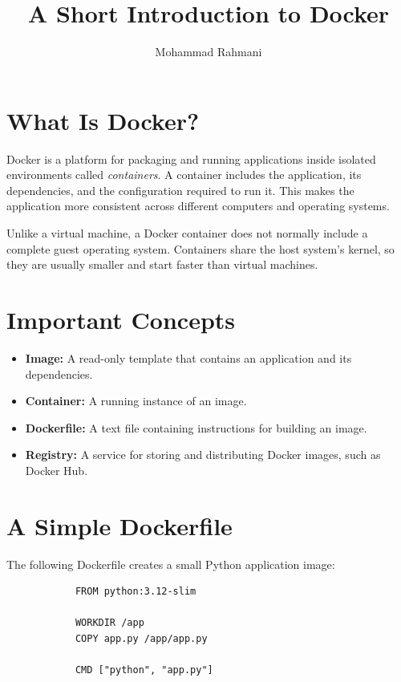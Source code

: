 \documentclass[a4paper]{article}
\title{A Short Introduction to Docker}
\date{}
\author{Mohammad Rahmani}
\begin{document}
    \maketitle
    
    
    \section{What Is Docker?}
        
        Docker is a platform for packaging and running applications inside isolated environments called \emph{containers}. A container includes the application, its dependencies, and the configuration required to run it. This makes the application more consistent across different computers and operating systems.
        
        Unlike a virtual machine, a Docker container does not normally include a complete guest operating system. Containers share the host system's kernel, so they are usually smaller and start faster than virtual machines.
    
    
    \section{Important Concepts}
        
        \begin{itemize}
            \item \textbf{Image:} A read-only template that contains an application and its dependencies.
            \item \textbf{Container:} A running instance of an image.
            \item \textbf{Dockerfile:} A text file containing instructions for building an image.
            \item \textbf{Registry:} A service for storing and distributing Docker images, such as Docker Hub.
        \end{itemize}
    
    
    \section{A Simple Dockerfile}
        
        The following Dockerfile creates a small Python application image:
        
        \begin{verbatim}
            FROM python:3.12-slim
            
            WORKDIR /app
            COPY app.py /app/app.py
            
            CMD ["python", "app.py"]
        \end{verbatim}
        
\end{document}
